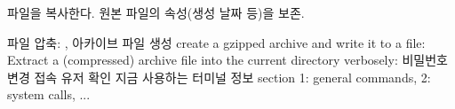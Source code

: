   \itm {} 파일을 복사한다.
  \bitmz
    \itm {} 원본 파일의 속성(생성 날짜 등)을 보존.
  \eitmz

  \itm {} 파일 압축: , 
  \itm {} 아카이브 파일 생성
  \bitmz
    \itm create a gzipped archive and write it to a file: 
    \itm Extract a (compressed) archive file into the current directory verbosely: 
  \eitmz
  \itm {} \rarr 비밀번호 변경
  \itm {} \rarr 접속 유저 확인
  \itm {} \rarr 지금 사용하는 터미널 정보
  \itm {} \rarr section 1: general commands, 2: system calls, ...
\eitmz
